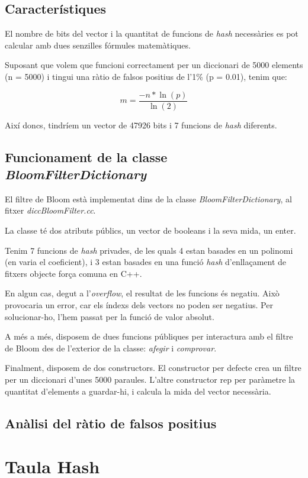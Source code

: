 \documentclass[titlepage]{article}
\begin{document}
\subsection{Característiques}
El nombre de bits del vector i la quantitat de funcions de \textit{hash} necessàries es pot calcular amb dues senzilles fórmules matemàtiques.

Suposant que volem que funcioni correctament per un diccionari de 5000 elements (n = 5000) i tingui una ràtio de falsos positius de l'1\% (p = 0.01), tenim que:

\[m = \frac{-n * \ln(p)}{\ln(2)}\]

Així doncs, tindríem un vector de 47926 bits i 7 funcions de \textit{hash} diferents.

\subsection{Funcionament de la classe \textit{BloomFilterDictionary}}
El filtre de Bloom està implementat dins de la classe \textit{BloomFilterDictionary}, al fitxer \textit{diccBloomFilter.cc}.

La classe té dos atributs públics, un vector de booleans i la seva mida, un enter.

Tenim 7 funcions de \textit{hash} privades, de les quals 4 estan basades en un polinomi (en varia el coeficient), i 3 estan basades en una funció \textit{hash} d'enllaçament de fitxers objecte força comuna en C++.

En algun cas, degut a l'\textit{overflow}, el resultat de les funcions és negatiu. Això provocaria un error, car els índexs dels vectors no poden ser negatius. Per solucionar-ho, l'hem passat per la funció de valor absolut.

A més a més, disposem de dues funcions públiques per interactura amb el filtre de Bloom des de l'exterior de la classe: \textit{afegir} i \textit{comprovar}. 

Finalment, disposem de dos constructors. El constructor per defecte crea un filtre per un diccionari d'unes 5000 paraules. L'altre constructor rep per paràmetre la quantitat d'elements a guardar-hi, i calcula la mida del vector necessària. 
\subsection{Anàlisi del ràtio de falsos positius}

\clearpage
\section{Taula Hash}
\end{document}
